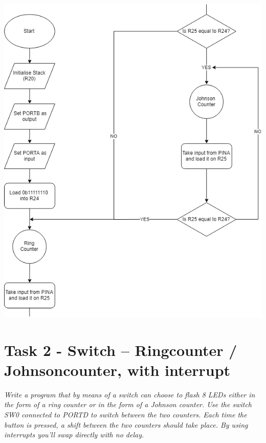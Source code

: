 \documentclass[a4paper,12pt]{article}
\begin{document}
\begin{center}
\includegraphics[scale=0.7]{img/Task1.png}
\end{center}
\newpage
\section{Task 2 - Switch – Ringcounter / Johnsoncounter, with interrupt}
\textit{Write a program that by means of a switch can choose to flash 8 LEDs either in the form of a ring
counter or in the form of a Johnson counter. Use the switch SW0 connected to PORTD to switch
between the two counters. Each time the button is pressed, a shift between the two counters
should take place. By using interrupts you’ll swap directly with no delay.}
\end{document}
